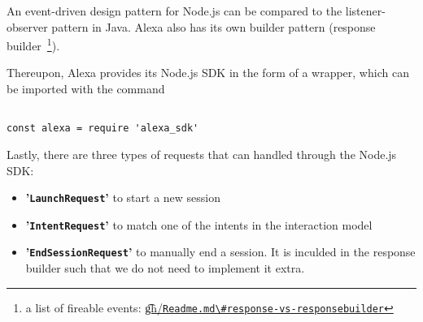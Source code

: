 

An event-driven design pattern for Node.js can be compared to the listener-observer pattern in Java. Alexa also has its own builder pattern (response builder~\footnote{a list of fireable events: %
	 \href{https://github.com/alexa/alexa-skills-kit-sdk-for-nodejs/blob/master/Readme.md\#response-vs-responsebuilder}{\t{gh}/\lstinline|Readme.md\#response-vs-responsebuilder|}}).


Thereupon, Alexa provides its Node.js SDK in the form of a wrapper, which can be imported with the command
\begin{verbatim}

const alexa = require 'alexa_sdk'
\end{verbatim}




Lastly, there are three types of requests that can handled through the Node.js SDK:

	
	\begin{itemize}
		\item \textbf{'\texttt{LaunchRequest}'} to start a new session
		\item \textbf{'\texttt{IntentRequest}'} to match one of the intents in the interaction model
		\item \textbf{'\texttt{EndSessionRequest}'} to manually end a session. It is inculded in the response builder such that we do not need to implement it extra.
		
	\end{itemize}



